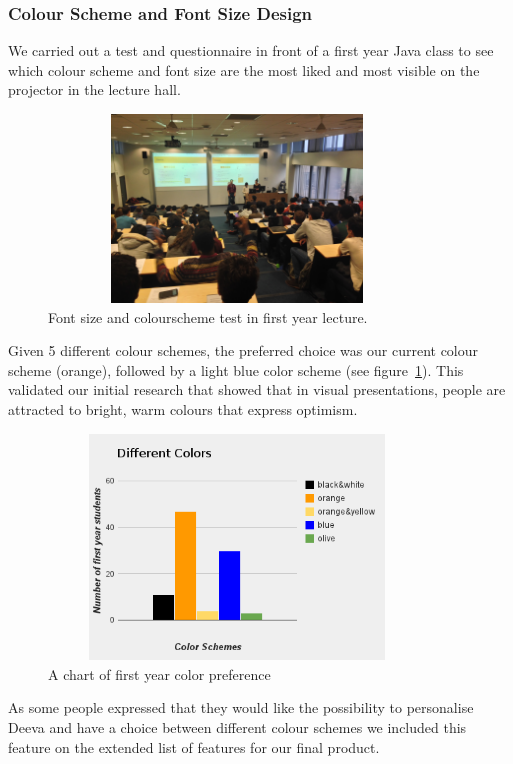 \documentclass[11pt, a4paper]{article}
\begin{document}
\subsubsection{Colour Scheme and Font Size Design}
We carried out a test and questionnaire in front of a first year Java class to see which colour scheme and font size are the most liked and most visible on the projector in the lecture hall.

\begin{figure}[h!]
\centering
\includegraphics[height=50mm,width=100mm]{lectureHall.jpg}
\caption{Font size and colourscheme test in first year lecture.}
\end{figure}

Given 5 different colour schemes, the preferred choice was our current colour scheme (orange), followed by a light blue color scheme (see figure~\ref{fig:colours}).
This validated our initial research that showed that in visual presentations, people are attracted to bright, warm colours that express optimism.
\begin{figure}[h!]
\centering
\includegraphics[height=60mm,width=100mm]{colours.png}
\caption{A chart of first year color preference}
\label{fig:colours}
\end{figure}

As some people expressed that they would like the possibility to personalise Deeva and have a choice between different colour schemes we included this feature on the extended list of features for our final product.
\end{document}
